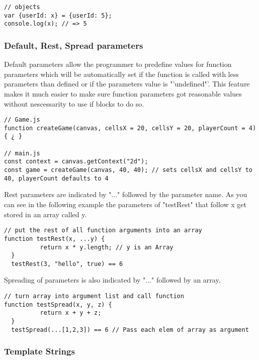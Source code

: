 \documentclass{bioinfo}
\begin{document}
\begin{lstlisting}[caption= My Javascript Example]
// objects
var {userId: x} = {userId: 5};
console.log(x); // => 5
\end{lstlisting}

\subsubsection{Default, Rest, Spread parameters}
Default parameters allow the programmer to predefine values for function parameters which will be automatically
set if the function is called with less parameters than defined or if the parameters value is "'undefined"'.
This feature makes it much easier to make sure function parameters got reasonable values without nescessarity to
use if blocks to do so.

\begin{lstlisting}[caption= My Javascript Example]
// Game.js
function createGame(canvas, cellsX = 20, cellsY = 20, playerCount = 4) { ¿ }

// main.js
const context = canvas.getContext("2d");
const game = createGame(canvas, 40, 40); // sets cellsX and cellsY to 40, playerCount defaults to 4
\end{lstlisting}

Rest parameters are indicated by  "..." followed by the parameter name. As you can see in the following 
example the parameters of "testRest" that follow x get stored in an array called y.

\begin{lstlisting}[caption= My Javascript Example]
// put the rest of all function arguments into an array
function testRest(x, ...y) {
          return x * y.length; // y is an Array
  }
  testRest(3, "hello", true) == 6
\end{lstlisting}

Spreading of parameters is also indicated by "..." followed by an array. 
\begin{lstlisting}[caption= My Javascript Example]
// turn array into argument list and call function
function testSpread(x, y, z) {
          return x + y + z;
  }
  testSpread(...[1,2,3]) == 6 // Pass each elem of array as argument
\end{lstlisting}

\subsubsection{Template Strings}
\end{document}

